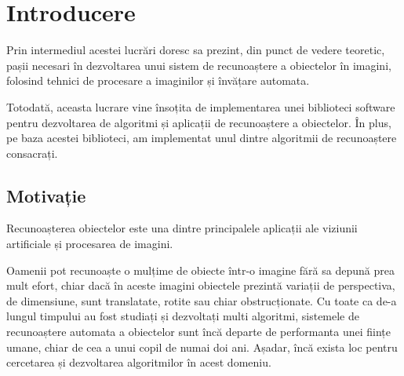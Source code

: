 \chapter{Introducere}


Prin intermediul acestei lucrări doresc sa prezint, din punct de vedere teoretic, pașii necesari în dezvoltarea unui sistem de recunoaștere a obiectelor în imagini, folosind tehnici de procesare a imaginilor și învățare automata.

Totodată, aceasta lucrare vine însoțita de implementarea unei biblioteci software pentru dezvoltarea de algoritmi și aplicații de recunoaștere a obiectelor.
În plus, pe baza acestei biblioteci, am implementat unul dintre algoritmii de recunoaștere consacrați.



\section{Motivație}

Recunoașterea obiectelor este una dintre principalele aplicații ale viziunii artificiale și procesarea de imagini. 

Oamenii pot recunoaște o mulțime de obiecte într-o imagine fără sa depună prea mult efort, chiar dacă în aceste imagini obiectele prezintă variații de perspectiva, de dimensiune, sunt translatate, rotite sau chiar obstrucționate. 
Cu toate ca de-a lungul timpului au fost studiați și dezvoltați multi algoritmi, sistemele de recunoaștere automata a obiectelor sunt încă departe de performanta unei ființe umane, chiar de cea a unui copil de numai doi ani.
Așadar, încă exista loc pentru cercetarea și dezvoltarea algoritmilor în acest domeniu.


